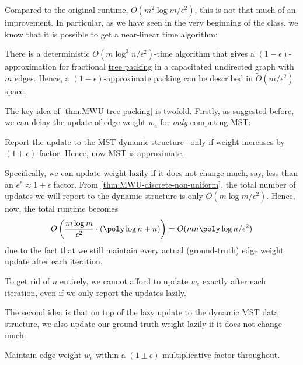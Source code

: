 Compared to the original runtime, \(O(m^2 \log m / \epsilon ^2)\), this is not that much of an improvement. In particular, as we have seen in the very beginning of the class, we know that it is possible to get a near-linear time algorithm:

\begin{theorem}\label{thm:MWU-tree-packing}
	There is a deterministic \(O(m \log ^3 n / \epsilon ^2)\)-time algorithm that gives a \((1 - \epsilon )\)-approximation for fractional \hyperref[prb:tree-packing]{tree packing} in a capacitated undirected graph with \(m\) edges. Hence, a \((1 - \epsilon )\)-approximate \hyperref[prb:tree-packing]{packing} can be described in \(\widetilde{O} (m / \epsilon ^2)\) space.
\end{theorem}

The key idea of \autoref{thm:MWU-tree-packing} is twofold. Firstly, as suggested before, we can delay the update of edge weight \(w_e\) for \emph{only} computing \hyperref[prb:MST]{MST}:

\begin{intuition}
	Report the update to the \hyperref[prb:MST]{MST} dynamic structure~\cite{holm2001poly} only if weight increases by \((1 + \epsilon )\) factor. Hence, now \hyperref[prb:MST]{MST} is approximate.
\end{intuition}

Specifically, we can update weight lazily if it does not change much, say, less than an \(e^{\epsilon } \approx 1 + \epsilon \) factor. From \autoref{thm:MWU-discrete-non-uniform}, the total number of updates we will report to the dynamic structure is only \(O(m \log m / \epsilon ^2)\). Hence, now, the total runtime becomes
\[
	O\left( \frac{m \log m}{\epsilon ^2} \cdot (\poly \log n + n) \right)
	= O(mn \poly \log n / \epsilon ^2)
\]
due to the fact that we still maintain every actual (ground-truth) edge weight update after each iteration.

\begin{remark}
	To get rid of \(n\) entirely, we cannot afford to update \(w_e\) exactly after each iteration, even if we only report the updates lazily.
\end{remark}

The second idea is that on top of the lazy update to the dynamic \hyperref[prb:MST]{MST} data structure, we also update our ground-truth weight lazily if it does not change much:

\begin{intuition}
	Maintain edge weight \(w_e\) within a \((1 \pm \epsilon )\) multiplicative factor throughout.
\end{intuition}

